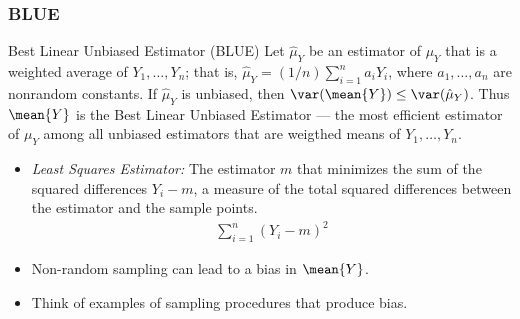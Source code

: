 \begin{frame}
\frametitle{BLUE}
\begin{emphbox}{Best Linear Unbiased Estimator (BLUE)}\justifying
Let $\hat{\mu}_{Y}$ be an estimator of $\mu_{Y}$ that is a weighted average of $Y_1,\ldots,Y_n$; that is, $\hat{\mu}_{Y} = (1/n)\sum_{i=1}^{n}a_iY_i$, where $a_1,\ldots,a_n$ are nonrandom constants. If $\hat{\mu}_{Y}$ is unbiased, then $\var(\mean{Y}) \leq \var(\hat{\mu}_{Y})$. Thus $\mean{Y}$ is the Best Linear Unbiased Estimator --- the most efficient estimator of $\mu_{Y}$ among all unbiased estimators that are weigthed means of $Y_1,\ldots,Y_n$. 
\end{emphbox}
\begin{itemize}
\item \emph{Least Squares Estimator:} The estimator $m$ that minimizes the sum of the squared differences $Y_i-m$, a measure of the total squared differences between the estimator and the sample points. 
\begin{align*}
\sum_{i=1}^n(Y_i-m)^2
\end{align*}
\item Non-random sampling can lead to a bias in $\mean{Y}$.
\item {} Think of examples of sampling procedures that produce bias.
\end{itemize}
\end{frame}

